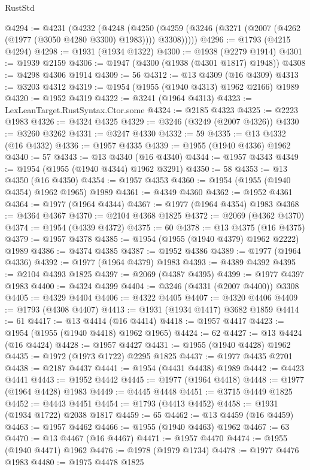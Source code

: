 \begin{lexlean}{RustStd}
\begin{coremodule}
@4294 := @4231
    (@4232
      (@4248
        (@4250 (@4259 (@3246 (@3271 (@2007 (@4262 (@1977 (@3050 @4280 @3300) @1983)))) @3308)))))
@4296 := @1793 (@4215 @4294)
@4298 := @1931 (@1934 @1322)
@4300 := @1938 (@2279 @1914)
@4301 := @1939 @2159
@4306 := @1947 (@4300 (@1938 (@4301 @1817) @1948))
@4308 := @4298 @4306 @1914
@4309 := 56
@4312 := @13 @4309 (@16 @4309)
@4313 := @3203 @4312
@4319 := @1954 (@1955 (@1940 @4313) @1962 @2166) @1989
@4320 := @1952 @4319
@4322 := @3241 (@1964 @4313)
@4323 := LexLeanTarget.RustSyntax.Ctor.some
@4324 := @2185 @4323
@4325 := @2223 @1983
@4326 := @4324 @4325
@4329 := @3246 (@3249 (@2007 @4326))
@4330 := @3260 @3262
@4331 := @3247 @4330
@4332 := 59
@4335 := @13 @4332 (@16 @4332)
@4336 := @1957 @4335
@4339 := @1955 (@1940 @4336) @1962
@4340 := 57
@4343 := @13 @4340 (@16 @4340)
@4344 := @1957 @4343
@4349 := @1954 (@1955 (@1940 @4344) @1962 @3291)
@4350 := 58
@4353 := @13 @4350 (@16 @4350)
@4354 := @1957 @4353
@4360 := @1954 (@1955 (@1940 @4354) @1962 @1965) @1989
@4361 := @4349 @4360
@4362 := @1952 @4361
@4364 := @1977 (@1964 @4344)
@4367 := @1977 (@1964 @4354) @1983
@4368 := @4364 @4367
@4370 := @2104 @4368 @1825
@4372 := @2069 (@4362 @4370)
@4374 := @1954 (@4339 @4372)
@4375 := 60
@4378 := @13 @4375 (@16 @4375)
@4379 := @1957 @4378
@4385 := @1954 (@1955 (@1940 @4379) @1962 @2222) @1989
@4386 := @4374 @4385
@4387 := @1952 @4386
@4389 := @1977 (@1964 @4336)
@4392 := @1977 (@1964 @4379) @1983
@4393 := @4389 @4392
@4395 := @2104 @4393 @1825
@4397 := @2069 (@4387 @4395)
@4399 := @1977 @4397 @1983
@4400 := @4324 @4399
@4404 := @3246 (@4331 (@2007 @4400)) @3308
@4405 := @4329 @4404
@4406 := @4322 @4405
@4407 := @4320 @4406
@4409 := @1793 (@4308 @4407)
@4413 := @1931 (@1934 @1417) @3682 @1859
@4414 := 61
@4417 := @13 @4414 (@16 @4414)
@4418 := @1957 @4417
@4423 := @1954 (@1955 (@1940 @4418) @1962 @1965)
@4424 := 62
@4427 := @13 @4424 (@16 @4424)
@4428 := @1957 @4427
@4431 := @1955 (@1940 @4428) @1962
@4435 := @1972 (@1973 @1722) @2295 @1825
@4437 := @1977 @4435 @2701
@4438 := @2187 @4437
@4441 := @1954 (@4431 @4438) @1989
@4442 := @4423 @4441
@4443 := @1952 @4442
@4445 := @1977 (@1964 @4418)
@4448 := @1977 (@1964 @4428) @1983
@4449 := @4445 @4448
@4451 := @3715 @4449 @1825
@4452 := @4443 @4451
@4454 := @1793 (@4413 @4452)
@4458 := @1931 (@1934 @1722) @2038 @1817
@4459 := 65
@4462 := @13 @4459 (@16 @4459)
@4463 := @1957 @4462
@4466 := @1955 (@1940 @4463) @1962
@4467 := 63
@4470 := @13 @4467 (@16 @4467)
@4471 := @1957 @4470
@4474 := @1955 (@1940 @4471) @1962
@4476 := @1978 (@1979 @1734)
@4478 := @1977 @4476 @1983
@4480 := @1975 @4478 @1825

\end{coremodule}
\end{lexlean}
